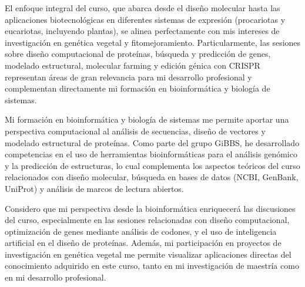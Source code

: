 \documentclass[11pt, letterpaper]{awesome-cv} %
\begin{document}
\begin{cvletter}
El enfoque integral del curso, que abarca desde el diseño molecular hasta las aplicaciones biotecnológicas en diferentes sistemas de expresión (procariotas y eucariotas, incluyendo plantas), se alinea perfectamente con mis intereses de investigación en genética vegetal y fitomejoramiento. Particularmente, las sesiones sobre diseño computacional de proteínas, búsqueda y predicción de genes, modelado estructural, molecular farming y edición génica con CRISPR representan áreas de gran relevancia para mi desarrollo profesional y complementan directamente mi formación en bioinformática y biología de sistemas.



Mi formación en bioinformática y biología de sistemas me permite aportar una perspectiva computacional al análisis de secuencias, diseño de vectores y modelado estructural de proteínas. Como parte del grupo GiBBS, he desarrollado competencias en el uso de herramientas bioinformáticas para el análisis genómico y la predicción de estructuras, lo cual complementa los aspectos teóricos del curso relacionados con diseño molecular, búsqueda en bases de datos (NCBI, GenBank, UniProt) y análisis de marcos de lectura abiertos.

Considero que mi perspectiva desde la bioinformática enriquecerá las discusiones del curso, especialmente en las sesiones relacionadas con diseño computacional, optimización de genes mediante análisis de codones, y el uso de inteligencia artificial en el diseño de proteínas. Además, mi participación en proyectos de investigación en genética vegetal me permite visualizar aplicaciones directas del conocimiento adquirido en este curso, tanto en mi investigación de maestría como en mi desarrollo profesional.


\end{cvletter}


\makeletterclosing %
\end{document}
